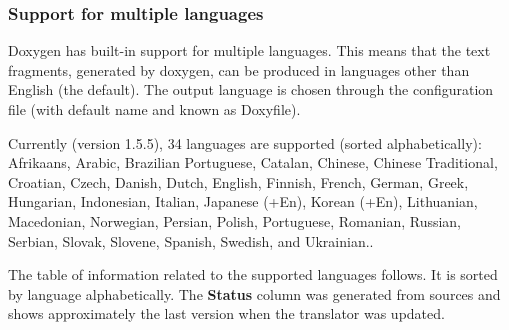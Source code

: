 \subsubsection*{Support for multiple languages}

Doxygen has built-in support for multiple languages. This means that the text fragments, generated by doxygen, can be produced in languages other than English (the default). The output language is chosen through the configuration file (with default name and known as Doxyfile).

Currently (version 1.5.5), 34 languages are supported (sorted alphabetically): Afrikaans, Arabic, Brazilian Portuguese, Catalan, Chinese, Chinese Traditional, Croatian, Czech, Danish, Dutch, English, Finnish, French, German, Greek, Hungarian, Indonesian, Italian, Japanese (+En), Korean (+En), Lithuanian, Macedonian, Norwegian, Persian, Polish, Portuguese, Romanian, Russian, Serbian, Slovak, Slovene, Spanish, Swedish, and Ukrainian..

The table of information related to the supported languages follows. It is sorted by language alphabetically. The {\bf Status} column was generated from sources and shows approximately the last version when the translator was updated.



